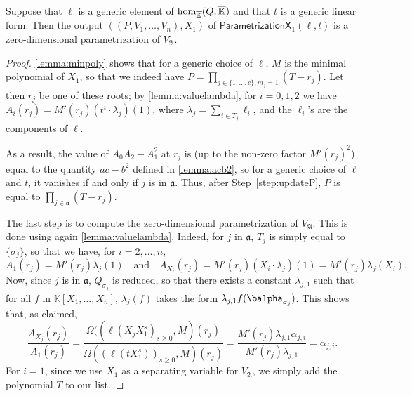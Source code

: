 \documentclass[12pt]{article}
\def\Kbar {{\ensuremath{\overline{\mathbb{K}}}}}
\begin{document}
\begin{lemma}
	Suppose that $\ell$ is a generic element of ${\rm
		hom}_{\Kbar}(Q,\Kbar)$ and that $t$ is a generic linear form. Then
	the output $((P,V_1,\dots,V_n),X_1)$ of
	$\mathsf{ParametrizationX}_1(\ell,t)$ is a zero-dimensional
	parametrization of $V_{\mathfrak{A}}$.
\end{lemma}
\begin{proof}
	\cref{lemma:minpoly} shows that for a generic choice of $\ell$,
	$M$ is the minimal polynomial of $X_1$, so that we indeed have
	$P=\prod_{j \in \{1,\dots,c\}, m_j=1} (T-r_j)$. Let then $r_j$ be
	one of these roots; by \cref{lemma:valuelambda}, for $i=0,1,2$
	we have $ A_i(r_j) = M'(r_j) (t^i \cdot \lambda_j)(1)$, where
	$\lambda_j =\sum_{i \in T_j} \ell_i$, and the $\ell_i$'s are the
	components of $\ell$. 
	
	As a result, the value of $ A_0  A_2 -  A_1^2$ at
	$r_j$ is (up to the non-zero factor $M'(r_j)^2$) equal to the
	quantity $ac-b^2$ defined in \cref{lemma:acb2}, so for a
	generic choice of $\ell$ and $t$, it vanishes if and only if $j$ is
	in $\mathfrak{a}$. Thus, after Step~\ref{step:updateP}, 
	$P$ is equal to $\prod_{j \in \mathfrak{a}} (T-r_j)$.
	
	The last step is to compute the zero-dimensional parametrization of
	$V_{\mathfrak{A}}$. This is done using again
	\cref{lemma:valuelambda}. Indeed, for $j$ in $\mathfrak{a}$, 
	$T_j$ is simply equal to $\{\sigma_j\}$, so that we have, for $i=2,\dots,n$,
	$$ A_1(r_j)=M'(r_j) \lambda_j(1) \quad\text{and}\quad 
	A_{X_i}(r_j) = M'(r_j) (X_i \cdot \lambda_j)(1) = M'(r_j) \lambda_j(X_i).$$ Now, since $j$
	is in $\mathfrak{a}$, $Q_{\sigma_j}$ is reduced, so that there
	exists a constant $\lambda_{j,1}$ such that for all $f$ in
	$\Kbar[X_1,\dots,X_n]$, $\lambda_j(f)$ takes the form $\lambda_{j,1}
	f(\balpha_{\sigma_j})$. This shows that, as claimed,
	$$\frac{ A_{X_j}(r_j)}{ A_1 (r_j)} = 
	\frac {\Omega((\ell(X_j X_1^s)_{s\ge0},M)(r_j)}{\Omega((\ell(t X_1^s))_{s\ge0},M)(r_j)}=
	\frac
	{M'(r_j) \lambda_{j,1} \alpha_{j,i}}{M'(r_j) \lambda_{j,1}} = \alpha_{j,i}.$$
	For $i=1$, since we use $X_1$ as a separating variable for $V_{\mathfrak{A}}$, 
	we simply add the polynomial $T$ to our list.
\end{proof}

\newpage


\end{document}
